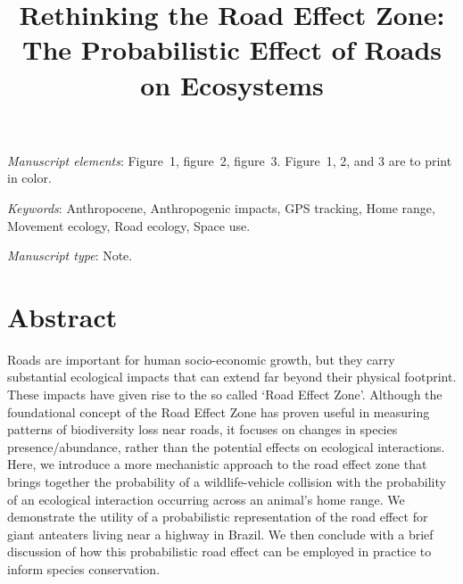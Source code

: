 \documentclass[11pt]{article}
\title{Rethinking the Road Effect Zone: The Probabilistic Effect of Roads on Ecosystems}
\date{}
\begin{document}
\maketitle

%
%
%
%

\bigskip

\textit{Manuscript elements}: Figure~1, figure~2, figure~3. Figure~1, 2, and 3 are to print in color.

\bigskip

\textit{Keywords}: Anthropocene, Anthropogenic impacts, GPS tracking, Home range, Movement ecology, Road ecology, Space use.

\bigskip

\textit{Manuscript type}: Note.

\bigskip



\newpage{}

\linenumbers

\section*{Abstract}

Roads are important for human socio-economic growth, but they carry substantial ecological impacts that can extend far beyond their physical footprint. These impacts have given rise to the so called `Road Effect Zone'. Although the foundational concept of the Road Effect Zone has proven useful in measuring patterns of biodiversity loss near roads, it focuses on changes in species presence/abundance, rather than the potential effects on ecological interactions. Here, we introduce a more mechanistic approach to the road effect zone that brings together the probability of a wildlife-vehicle collision with the probability of an ecological interaction occurring across an animal’s home range. We demonstrate the utility of a probabilistic representation of the road effect for giant anteaters living near a highway in Brazil. We then conclude with a brief discussion of how this probabilistic road effect can be employed in practice to inform species conservation.
\end{document}
